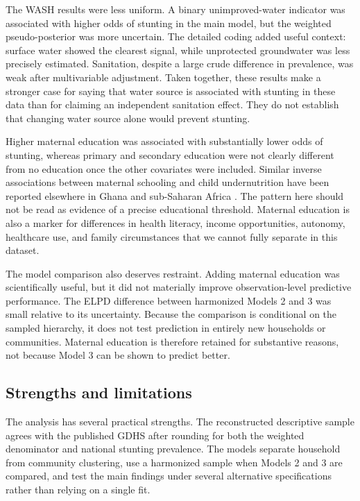 \documentclass[11pt]{article}
\begin{document}
The WASH results were less uniform. A binary unimproved-water indicator was associated with higher odds of stunting in the main model, but the weighted pseudo-posterior was more uncertain. The detailed coding added useful context: surface water showed the clearest signal, while unprotected groundwater was less precisely estimated. Sanitation, despite a large crude difference in prevalence, was weak after multivariable adjustment. Taken together, these results make a stronger case for saying that water source is associated with stunting in these data than for claiming an independent sanitation effect. They do not establish that changing water source alone would prevent stunting.

Higher maternal education was associated with substantially lower odds of stunting, whereas primary and secondary education were not clearly different from no education once the other covariates were included. Similar inverse associations between maternal schooling and child undernutrition have been reported elsewhere in Ghana and sub-Saharan Africa \citep{AhetoEtAl2015,TakeleEtAl2022,AgyenEtAl2024}. The pattern here should not be read as evidence of a precise educational threshold. Maternal education is also a marker for differences in health literacy, income opportunities, autonomy, healthcare use, and family circumstances that we cannot fully separate in this dataset.

The model comparison also deserves restraint. Adding maternal education was scientifically useful, but it did not materially improve observation-level predictive performance. The ELPD difference between harmonized Models 2 and 3 was small relative to its uncertainty. Because the comparison is conditional on the sampled hierarchy, it does not test prediction in entirely new households or communities. Maternal education is therefore retained for substantive reasons, not because Model 3 can be shown to predict better.

\subsection{Strengths and limitations}

The analysis has several practical strengths. The reconstructed descriptive sample agrees with the published GDHS after rounding for both the weighted denominator and national stunting prevalence. The models separate household from community clustering, use a harmonized sample when Models 2 and 3 are compared, and test the main findings under several alternative specifications rather than relying on a single fit.
\end{document}
